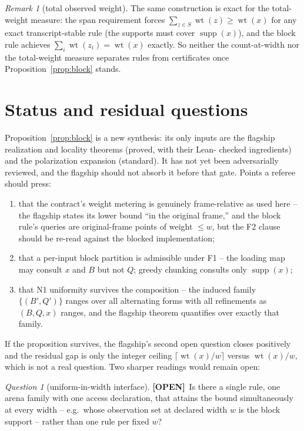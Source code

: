 \documentclass[11pt]{article}
\theoremstyle{definition}
\theoremstyle{remark}
\newtheorem{remark}[theorem]{Remark}
\newtheorem{question}[theorem]{Question}
\newcommand{\wt}{\operatorname{wt}}
\newcommand{\supp}{\operatorname{supp}}
\newcommand{\taglabel}[1]{\textnormal{\textbf{[#1]}}}
\newcommand{\OPEN}{\taglabel{OPEN}}
\begin{document}
\begin{remark}[total observed weight]\label{rem:total}
The same construction is exact for the total-weight measure: the span
requirement forces $\sum_{z\in S}\wt(z)\geq\wt(x)$ for any exact
transcript-stable rule (the supports must cover $\supp(x)$), and the
block rule achieves $\sum_i\wt(z_i)=\wt(x)$ exactly.  So neither the
count-at-width nor the total-weight measure separates rules from
certificates once Proposition~\ref{prop:block} stands.
\end{remark}

\section{Status and residual questions}

Proposition~\ref{prop:block} is a new synthesis: its only inputs are the
flagship realization and locality theorems (proved, with their Lean-
checked ingredients) and the polarization expansion
(standard).  It has not yet been adversarially reviewed, and the
flagship should not absorb it before that gate.  Points a referee should
press:

\begin{enumerate}[leftmargin=*,itemsep=2pt]
\item that the contract's weight metering is genuinely frame-relative as
used here -- the flagship states its lower bound ``in the original
frame,'' and the block rule's queries are original-frame points of
weight $\leq w$, but the F2 clause should be re-read against the blocked
implementation;
\item that a per-input block partition is admissible under F1 -- the
loading map may consult $x$ and $B$ but not $Q$; greedy chunking
consults only $\supp(x)$;
\item that N1 uniformity survives the composition -- the induced family
$\{(B',Q')\}$ ranges over all alternating forms with all refinements as
$(B,Q,x)$ ranges, and the flagship theorem quantifies over exactly that
family.
\end{enumerate}

If the proposition survives, the flagship's second open question closes
positively and the residual gap is only the integer ceiling
$\lceil\wt(x)/w\rceil$ versus $\wt(x)/w$, which is not a real question.
Two sharper readings would remain open:

\begin{question}[uniform-in-width interface]\label{q:uniform}
\OPEN\ Is there a single rule, one arena family with one access
declaration, that attains the bound simultaneously at every width --
e.g.\ whose observation set at declared width $w$ is the block support
-- rather than one rule per fixed $w$?
\end{question}
\end{document}
